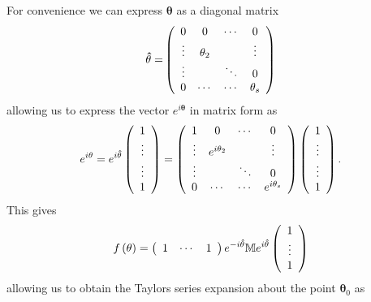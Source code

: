 \documentclass[aps,preprint]{revtex4}%
\begin{document}
For convenience we can express $\mathbf{\theta}$ as a diagonal matrix
\begin{equation}
\mathbf{\hat{\theta}=}\left(
\begin{array}
[c]{cccc}%
0 & 0 & \cdots & 0\\
\vdots & \theta_{2} &  & \vdots\\
\vdots &  & \ddots & 0\\
0 & \cdots & \cdots & \theta_{s}%
\end{array}
\right)
\end{equation}
allowing us to express the vector $e^{i\mathbf{\theta}}$ in matrix form as%
\begin{equation}
e^{i\mathbf{\theta}}=e^{i\mathbf{\hat{\theta}}}\left(
\begin{array}
[c]{c}%
1\\
\vdots\\
\vdots\\
1
\end{array}
\right)  =\left(
\begin{array}
[c]{cccc}%
1 & 0 & \cdots & 0\\
\vdots & e^{i\theta_{2}} &  & \vdots\\
\vdots &  & \ddots & 0\\
0 & \cdots & \cdots & e^{i\theta_{s}}%
\end{array}
\right)  \left(
\begin{array}
[c]{c}%
1\\
\vdots\\
\vdots\\
1
\end{array}
\right)  .
\end{equation}
This gives
\begin{equation}
f\left(  \mathbf{\theta}\right)  =\left(
\begin{array}
[c]{ccc}%
1 & \cdots & 1
\end{array}
\right)  e^{-i\mathbf{\hat{\theta}}}\mathbb{M}e^{i\mathbf{\hat{\theta}}%
}\left(
\begin{array}
[c]{c}%
1\\
\vdots\\
1
\end{array}
\right)
\end{equation}
allowing us to obtain the Taylors series expansion about the point
$\mathbf{\theta}_{0}$ as
\end{document}
